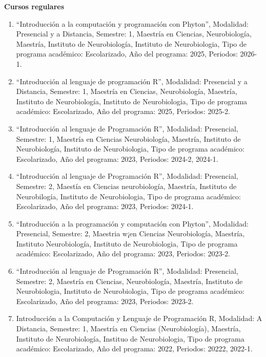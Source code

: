 {\large \textbf{Cursos regulares}}

\hrulefill

\begin{enumerate}

\item “Introducción a la computación y programación con Phyton”, Modalidad: Presencial y a Distancia, 
Semestre: 1, 
Maestría en Ciencias, Neurobiología, Maestría, Instituto de Neurobiología, Instituto de Neurobiologia, Tipo de 
programa académico: Escolarizado, Año del programa: 2025, Periodos: 2026-1.

\item “Introducción al lenguaje de programación R”, Modalidad: Presencial y a Distancia, Semestre: 1, Maestría 
en 
Ciencias, Neurobiología, Maestría, Instituto de Neurobiología, Instituto de Neurobiologia, Tipo de programa 
académico: Escolarizado, Año del programa: 2025, Periodos: 2025-2.

\item “Introducción al lenguaje de Programación R”, Modalidad: Presencial, Semestre: 1, Maestría en Ciencias 
Neurobiología, Maestría, Instituto de Neurobiología, Instituto de Neurobiologia, Tipo de programa académico: 
Escolarizado, Año del programa: 2023, Periodos: 2024-2, 2024-1.

\item “Introducción al lenguaje de Programación R”, Modalidad: Presencial, Semestre: 2, Maestía en Ciencias 
neurobiología, Maestría, Instituto de Neurobilogía, Instituto de Neurobiologia, Tipo de programa académico: 
Escolarizado, Año del programa: 2023, Periodos: 2024-1.

\item “Introducción a la programación y computación con Phyton”, Modalidad: Presencial, Semestre: 2, Maestria 
w¡en 
Ciencias Neurobiología, Maestría, Instituto Neurobiología, Instituto de Neurobiologia, Tipo de programa 
académico: Escolarizado, Año del programa: 2023, Periodos: 2023-2.

\item “Introducción al lenguaje de Programación R”, Modalidad: Presencial, Semestre: 2, Maestría en Ciencias, 
Neurobiología, Maestría, Instituto de Neurobiologia, Instituto de Neurobiologia, Tipo de programa académico: 
Escolarizado, Año del programa: 2023, Periodos: 2023-2.

\item Introducción a la Computación y Lenguaje de Programación R, Modalidad: A Distancia, Semestre: 1, 
Maestría en 
Ciencias (Neurobiología), Maestría, Instituto de Neurobiología, Instituo de Neurobiologia, Tipo de programa 
académico: Escolarizado, Año del programa: 2022, Periodos: 20222, 2022-1.


\end{enumerate}
